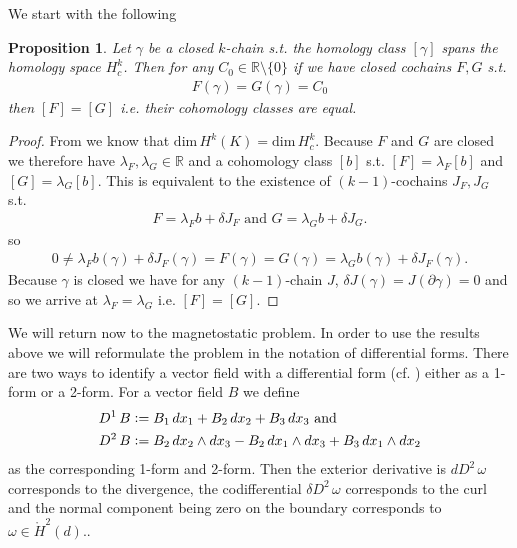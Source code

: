 \documentclass[12pt,a4paper]{article}
\newtheorem{proposition}{Proposition}
\theoremstyle{definition}
\newcommand{\real}{\mathbb{R}}
\begin{document}
We start with the following
\begin{proposition}\label{uniqueness_cochain}
    Let $\gamma$ be a closed $k$-chain s.t. the homology class $[\gamma]$ 
    spans the homology space $H^k_c$. Then for any $C_0 \in \real 
    \setminus \{0\}$ 
    if we have closed cochains $F,G$ s.t.
    \begin{align*}
    F(\gamma) = G(\gamma)= C_0
    \end{align*}
    then $[F] = [G]$ i.e. their cohomology classes are equal.
\end{proposition} 
\begin{proof}
    From \cite[Sec. 2.5]{arnold} we know that 
    $\text{dim}\,H^k(K) = \text{dim}\,H^k_c$. Because $F$ and $G$ are closed we
    therefore have $\lambda_F, \lambda_G \in \real$ and a cohomology class 
    $[b]$ s.t.
    $[F] = \lambda_F [b]$ and $[G] = \lambda_G [b]$. This is 
    equivalent to the existence of $(k-1)$-cochains $J_F,J_G$ s.t. 
    \begin{align*}
        F = \lambda_F b + \delta J_F \text{ and } G = \lambda_G b + \delta J_G.
    \end{align*}
    so 
    \begin{align*}
        0 \neq \lambda_F b(\gamma) + \delta J_F(\gamma) = F(\gamma) = G(\gamma)
        = \lambda_G b(\gamma) + \delta J_F(\gamma).
    \end{align*}
    Because $\gamma$ is closed we have for any $(k-1)$-chain $J$, 
    $\delta J(\gamma) = J(\partial \gamma) = 0$ and so we arrive at
    $\lambda_F = \lambda_G$ i.e. $[F] = [G]$.
\end{proof}


We will return now to the magnetostatic problem. In order to use the results
above we will reformulate the problem in the notation of differential forms.
There are two ways to identify a vector field with a differential form 
(cf. \cite[Table 6.1 and p.70]{arnold}) either as a 1-form or a 2-form. 
For a vector field $B$ we define
\begin{align*}
    D^1\, B &\vcentcolon= B_1 \, dx_1 + B_2 \, dx_2 + B_3\, dx_3 \text{ and}\\
    D^2\, B &\vcentcolon= B_2 \, dx_2 \wedge dx_3 - B_2 \, dx_1 \wedge dx_3
        + B_3 \, dx_1 \wedge dx_2
\end{align*} 
as the corresponding 1-form and 2-form. 
Then the exterior derivative is $dD^2\,\omega$ corresponds to the divergence,
the codifferential $\delta D^2\,\omega$ 
corresponds to the curl and the normal component
being zero on the boundary corresponds 
to $\omega \in \mathring{H}^2(d)$.\cite{}. 
\end{document}
